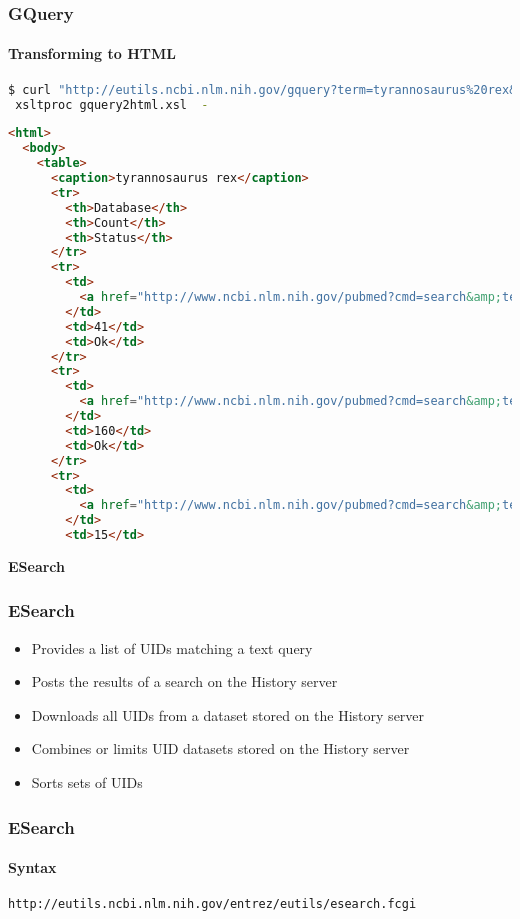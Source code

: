 \documentclass{beamer}
\newcommand{\centeredtitle}[1]{
\begin{center}
    \Huge{\bf{#1}}
\end{center}
}
\newcommand{\hugeslide}[1]{
\begin{frame}
\centeredtitle{#1}
\end{frame}
}
\begin{document}
\begin{frame}[fragile]
\frametitle{GQuery}
\framesubtitle{Transforming to HTML}
\begin{lstlisting}[language=bash,basicstyle=\tiny,breaklines=true]
 $ curl "http://eutils.ncbi.nlm.nih.gov/gquery?term=tyrannosaurus%20rex&retmode=xml" |\
 xsltproc gquery2html.xsl  -
\end{lstlisting}

\begin{lstlisting}[language=html,basicstyle=\tiny,breaklines=false]
<html>
  <body>
    <table>
      <caption>tyrannosaurus rex</caption>
      <tr>
        <th>Database</th>
        <th>Count</th>
        <th>Status</th>
      </tr>
      <tr>
        <td>
          <a href="http://www.ncbi.nlm.nih.gov/pubmed?cmd=search&amp;term=tyrannosaurus+rex">pubmed</a>
        </td>
        <td>41</td>
        <td>Ok</td>
      </tr>
      <tr>
        <td>
          <a href="http://www.ncbi.nlm.nih.gov/pubmed?cmd=search&amp;term=tyrannosaurus+rex">pmc</a>
        </td>
        <td>160</td>
        <td>Ok</td>
      </tr>
      <tr>
        <td>
          <a href="http://www.ncbi.nlm.nih.gov/pubmed?cmd=search&amp;term=tyrannosaurus+rex">mesh</a>
        </td>
        <td>15</td>
\end{lstlisting}
\end{frame}



\hugeslide{ESearch}

\begin{frame}[fragile]
\frametitle{ESearch}
\begin{itemize}
\item Provides a list of UIDs matching a text query
\item Posts the results of a search on the History server
\item Downloads all UIDs from a dataset stored on the History server
\item Combines or limits UID datasets stored on the History server
\item Sorts sets of UIDs
\end{itemize}
\end{frame}


\begin{frame}[fragile]
\frametitle{ESearch}
\framesubtitle{Syntax}
\begin{lstlisting}
http://eutils.ncbi.nlm.nih.gov/entrez/eutils/esearch.fcgi
\end{lstlisting}
\end{frame}
\end{document}
